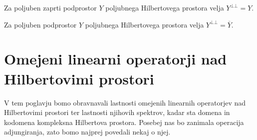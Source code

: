 \documentclass[mat2]{matdelo}
\begin{document}
		\begin{posledica}
			\label{posl:zaportoggost}
			Za poljuben zaprti podprostor $Y$ poljubnega Hilbertovega prostora velja $Y^{\bot\bot} = Y$.
		\end{posledica}
		
		\begin{posledica}
			\label{posl:ortoggost}
			Za poljuben podprostor $Y$ poljubnega Hilbertovega prostora velja $Y^{\bot\bot} = \overline{Y}$.
		\end{posledica}
		
	\section{Omejeni linearni operatorji nad Hilbertovimi prostori}
		V tem poglavju bomo obravnavali lastnosti omejenih linearnih operatorjev nad Hilbertovimi prostori ter lastnosti njihovih spektrov, kadar sta domena in kodomena kompleksna Hilbertova prostora. Posebej nas bo zanimala operacija adjungiranja, zato bomo najprej povedali nekaj o njej.
\end{document}
